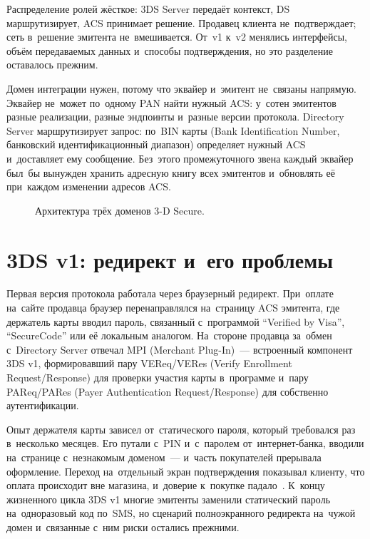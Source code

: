 Распределение ролей жёсткое: 3DS Server передаёт контекст, DS маршрутизирует,
ACS принимает решение. Продавец клиента не~подтверждает; сеть в~решение
эмитента не~вмешивается. От~v1 к~v2 менялись интерфейсы, объём передаваемых
данных и~способы подтверждения, но это разделение оставалось прежним.

Домен интеграции нужен, потому что эквайер и~эмитент не~связаны
напрямую. Эквайер не~может по~одному PAN найти нужный ACS:
у~сотен эмитентов разные реализации, разные эндпоинты и~разные версии
протокола. Directory Server маршрутизирует запрос: по~BIN карты (Bank
Identification Number, банковский идентификационный диапазон) определяет нужный
ACS и~доставляет ему сообщение. Без~этого промежуточного звена каждый эквайер
был~бы вынужден хранить адресную книгу всех эмитентов и~обновлять её при~каждом
изменении адресов ACS.

\begin{figure}[htbp]
  \centering
  \caption{Архитектура трёх доменов 3-D Secure.}\label{fig:3ds-three-domains}
\end{figure}

\section{3DS v1: редирект и~его проблемы}\label{sec:3ds-v1}

Первая версия протокола работала через браузерный редирект. При~оплате на~сайте
продавца браузер перенаправлялся на~страницу ACS эмитента, где держатель карты
вводил пароль, связанный с~программой \enquote{Verified by Visa},
\enquote{SecureCode} или её локальным аналогом. На~стороне продавца за~обмен
с~Directory Server отвечал MPI (Merchant Plug-In)~--- встроенный компонент 3DS
v1, формировавший пару VEReq/VERes (Verify Enrollment Request/Response) для
проверки участия карты в~программе и~пару PAReq/PARes (Payer Authentication
Request/Response) для собственно аутентификации.

Опыт держателя карты зависел от~статического пароля, который требовался раз
в~несколько месяцев. Его путали с~PIN и~с~паролем от~интернет-банка,
вводили на~странице с~незнакомым доменом~--- и~часть покупателей прерывала
оформление. Переход на~отдельный экран подтверждения показывал клиенту, что
оплата происходит вне магазина, и~доверие к~покупке
падало~\cite{visa-secure-ui-3ds1-0-2}. К~концу жизненного цикла 3DS v1 многие
эмитенты заменили статический пароль на~одноразовый код по~SMS, но сценарий
полноэкранного редиректа на~чужой домен и~связанные с~ним риски остались
прежними.

